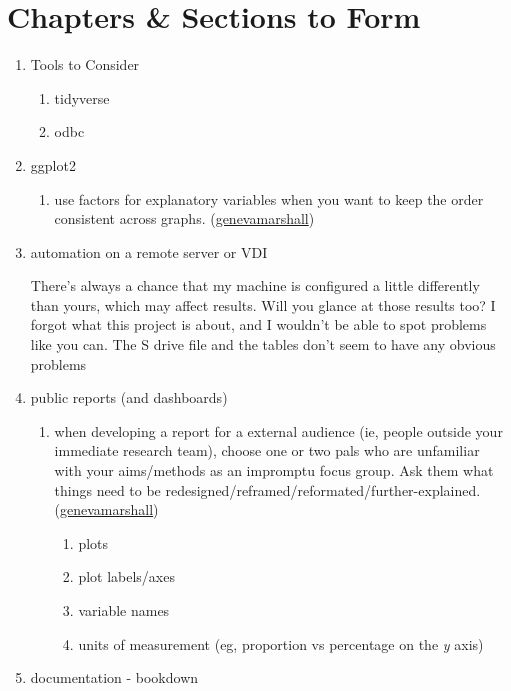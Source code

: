 \documentclass[
]{book}
\providecommand{\tightlist}{%
  \setlength{\itemsep}{0pt}\setlength{\parskip}{0pt}}
\begin{document}
\hypertarget{chapters-sections-to-form}{%
\section{Chapters \& Sections to Form}\label{chapters-sections-to-form}}

\begin{enumerate}
\def\labelenumi{\arabic{enumi}.}
\item
  Tools to Consider

  \begin{enumerate}
  \def\labelenumii{\arabic{enumii}.}
  \tightlist
  \item
    tidyverse
  \item
    odbc
  \end{enumerate}
\item
  ggplot2

  \begin{enumerate}
  \def\labelenumii{\arabic{enumii}.}
  \tightlist
  \item
    use factors for explanatory variables when you want to keep the order consistent across graphs. (\href{https://github.com/genevamarshall}{genevamarshall})
  \end{enumerate}
\item
  automation on a remote server or VDI

  There's always a chance that my machine is configured a little differently than yours, which may affect results. Will you glance at those results too? I forgot what this project is about, and I wouldn't be able to spot problems like you can. The S drive file and the tables don't seem to have any obvious problems
\item
  public reports (and dashboards)

  \begin{enumerate}
  \def\labelenumii{\arabic{enumii}.}
  \tightlist
  \item
    when developing a report for a external audience (ie, people outside your immediate research team), choose one or two pals who are unfamiliar with your aims/methods as an impromptu focus group. Ask them what things need to be redesigned/reframed/reformated/further-explained. (\href{https://github.com/genevamarshall}{genevamarshall})

    \begin{enumerate}
    \def\labelenumiii{\arabic{enumiii}.}
    \tightlist
    \item
      plots
    \item
      plot labels/axes
    \item
      variable names
    \item
      units of measurement (eg, proportion vs percentage on the \emph{y} axis)
    \end{enumerate}
  \end{enumerate}
\item
  documentation - bookdown


\end{enumerate}
\end{document}
